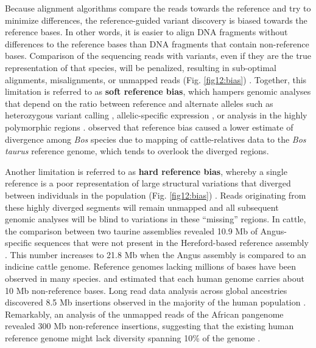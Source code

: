 \documentclass[../main.tex]{subfiles}
\begin{document}
Because alignment algorithms compare the reads towards the reference and try to minimize differences, the reference-guided variant discovery is biased towards the reference bases. In other words, it is easier to align DNA fragments without differences to the reference bases than DNA fragments  that contain non-reference bases. Comparison of the sequencing reads with variants, even if they are the true representation of that species, will be penalized, resulting in sub-optimal alignments, misalignments, or unmapped reads (Fig. \ref{fig12:bias}) \citep{pritt2018forge}. Together, this limitation is referred to as \textbf{soft reference bias}, which hampers genomic analyses that depend on the ratio between reference and alternate alleles such as heterozygous variant calling \citep{garrison2018variation}, allelic-specific expression \citep{salavati2019elimination}, or analysis in the highly polymorphic regions \citep{dilthey2015improved}. \citet{wu2018pervasive} observed that reference bias caused a lower estimate of divergence among \emph{Bos} species due to mapping of cattle-relatives data to the \emph{Bos taurus} reference genome, which tends to overlook the diverged regions. 

Another limitation is referred to as \textbf{hard reference bias}, whereby a single reference is a poor representation of large structural variations that diverged between individuals in the population (Fig. \ref{fig12:bias}) \citep{colquhoun2020nucleotide}. Reads originating from these highly diverged segments will remain unmapped and all subsequent genomic analyses will be blind to variations in these “missing” regions. In cattle, the comparison between two taurine assemblies revealed 10.9 Mb of Angus-specific sequences that were not present in the Hereford-based reference assembly \citep{Low2020}. This number increases to 21.8 Mb when the Angus assembly is compared to an indicine cattle genome. Reference genomes lacking millions of bases have been observed in many species. \citet{ameur2018novo} and \citet{audano2019characterizing} estimated that each human genome carries about 10 Mb non-reference bases. Long read data analysis across global ancestries discovered 8.5 Mb insertions observed in the majority of the human population \citep{audano2019characterizing}. Remarkably, an analysis of the unmapped reads of the African pangenome revealed 300 Mb non-reference insertions, suggesting that the existing human reference genome might lack diversity spanning 10\% of the genome \citep{sherman2019assembly}. \\
\end{document}
